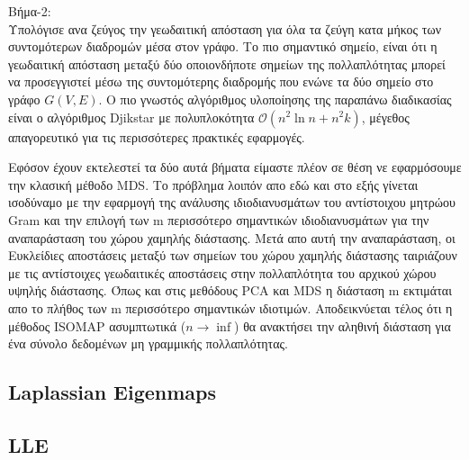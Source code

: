 \par
Βήμα-2: \\ Υπολόγισε ανα ζεύγος την γεωδαιτική απόσταση για όλα τα ζεύγη κατα μήκος των συντομότερων διαδρομών μέσα στον γράφο. Το πιο σημαντικό σημείο, είναι ότι η γεωδαιτική απόσταση μεταξύ δύο οποιονδήποτε σημείων της πολλαπλότητας μπορεί να προσεγγιστεί μέσω της συντομότερης διαδρομής που ενώνε τα δύο σημείο στο γράφο $G(V,E)$. Ο πιο γνωστός αλγόριθμος υλοποίησης της παραπάνω διαδικασίας είναι ο αλγόριθμος \textlatin{Djikstar} με πολυπλοκότητα $\mathcal{O}(n^{2}\ln n + n^{2}k)$, μέγεθος απαγορευτικό για τις περισσότερες πρακτικές εφαρμογές.
\par
Εφόσον έχουν εκτελεστεί τα δύο αυτά βήματα είμαστε πλέον σε θέση νε εφαρμόσουμε την κλασική μέθοδο \textlatin{MDS}. Το πρόβλημα λοιπόν απο εδώ και στο εξής γίνεται ισοδύναμο με την εφαρμογή της ανάλυσης ιδιοδιανυσμάτων του αντίστοιχου μητρώου \textlatin{Gram} και την επιλογή των \textlatin{m} περισσότερο σημαντικών ιδιοδιανυσμάτων για την αναπαράσταση του χώρου χαμηλής διάστασης. Μετά απο αυτή την αναπαράσταση, οι Ευκλείδιες αποστάσεις μεταξύ των σημείων του χώρου χαμηλής διάστασης ταιριάζουν με τις αντίστοιχες γεωδαιτικές αποστάσεις στην πολλαπλότητα του αρχικού χώρου υψηλής διάστασης. Όπως και στις μεθόδους \textlatin{PCA} και \textlatin{MDS} η διάσταση \textlatin{m} εκτιμάται απο το πλήθος των \textlatin{m} περισσότερο σημαντικών ιδιοτιμών. Αποδεικνύεται τέλος ότι η μέθοδος \textlatin{ISOMAP} ασυμπτωτικά ($n \rightarrow \inf$) θα ανακτήσει την αληθινή διάσταση για ένα σύνολο δεδομένων μη γραμμικής πολλαπλότητας.

\subsection{\textlatin{Laplassian Eigenmaps}}
\par


\subsection{\textlatin{LLE}}
\par

